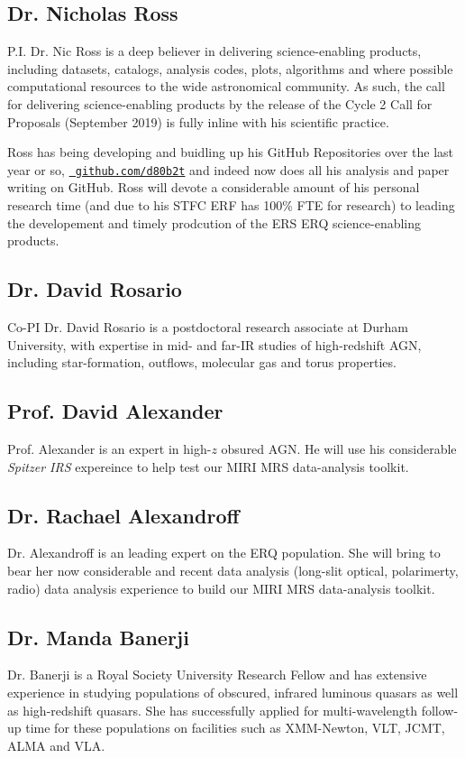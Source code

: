 \documentclass[11pt,a4paper]{article}
\begin{document}
\subsection*{Dr. Nicholas Ross}
P.I. Dr. Nic Ross is a deep believer in delivering science-enabling
products, including datasets, catalogs, analysis codes, plots,
algorithms and where possible computational resources to the wide
astronomical community.  As such, the call for delivering
science-enabling products by the release of the Cycle 2 Call for
Proposals (September 2019) is fully inline with his scientific
practice.

\smallskip \smallskip
\noindent
Ross has being developing and buidling up his GitHub Repositories over
the last year or so, \href{https://github.com/d80b2t}{\tt
github.com/d80b2t} and indeed now does all his analysis and paper
writing on GitHub.
Ross will devote a considerable amount of his personal research time
(and due to his STFC ERF has 100\% FTE for research) to leading the
developement and timely prodcution of the ERS ERQ science-enabling
products.


\subsection*{Dr. David Rosario} 
Co-PI Dr. David Rosario is a postdoctoral research associate at Durham
University, with expertise in mid- and far-IR studies of high-redshift
AGN, including star-formation, outflows, molecular gas and torus
properties.


\subsection*{Prof. David Alexander} 
Prof. Alexander is an expert in high-$z$ obsured AGN.  He will use his
considerable {\it Spitzer IRS} expereince to help test our MIRI MRS
data-analysis toolkit.


\subsection*{Dr. Rachael Alexandroff} 
Dr. Alexandroff is an leading expert on the ERQ population.  She will
bring to bear her now considerable and recent data analysis (long-slit
optical, polarimerty, radio) data analysis experience to build our
MIRI MRS data-analysis toolkit.


\subsection*{Dr. Manda Banerji}
Dr. Banerji is a Royal Society University Research Fellow and has
extensive experience in studying populations of obscured, infrared
luminous quasars as well as high-redshift quasars. She has
successfully applied for multi-wavelength follow-up time for these
populations on facilities such as XMM-Newton, VLT, JCMT, ALMA and
VLA.
\end{document}
